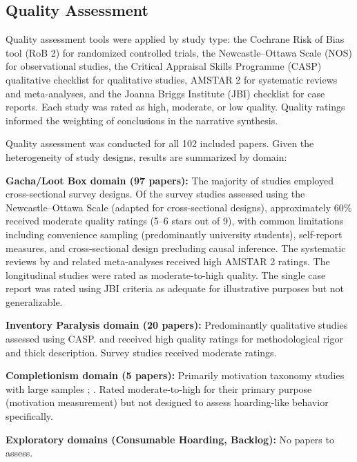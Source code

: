 \documentclass[12pt]{article}
\begin{document}
\subsection{Quality Assessment}

Quality assessment tools were applied by study type: the Cochrane Risk of Bias tool (RoB 2) for randomized controlled trials, the Newcastle--Ottawa Scale (NOS) for observational studies, the Critical Appraisal Skills Programme (CASP) qualitative checklist for qualitative studies, AMSTAR 2 for systematic reviews and meta-analyses, and the Joanna Briggs Institute (JBI) checklist for case reports. Each study was rated as high, moderate, or low quality. Quality ratings informed the weighting of conclusions in the narrative synthesis.

Quality assessment was conducted for all 102 included papers. Given the heterogeneity of study designs, results are summarized by domain:

\textbf{Gacha/Loot Box domain (97 papers):} The majority of studies employed cross-sectional survey designs. Of the survey studies assessed using the Newcastle--Ottawa Scale (adapted for cross-sectional designs), approximately 60\% received moderate quality ratings (5--6 stars out of 9), with common limitations including convenience sampling (predominantly university students), self-report measures, and cross-sectional design precluding causal inference. The systematic reviews by \citet{Spicer2022} and related meta-analyses received high AMSTAR 2 ratings. The longitudinal studies \citep{Shibuya2019, Zendle2023b} were rated as moderate-to-high quality. The single case report \citep{Inaguma2024} was rated using JBI criteria as adequate for illustrative purposes but not generalizable.

\textbf{Inventory Paralysis domain (20 papers):} Predominantly qualitative studies assessed using CASP. \citet{Watkins2012} and \citet{Koles2025} received high quality ratings for methodological rigor and thick description. Survey studies \citep{Koklic2025} received moderate ratings.

\textbf{Completionism domain (5 papers):} Primarily motivation taxonomy studies with large samples \citep[n=30,000]{Yee2006}; \citep[n=3,818]{Demetrovics2011}. Rated moderate-to-high for their primary purpose (motivation measurement) but not designed to assess hoarding-like behavior specifically.

\textbf{Exploratory domains (Consumable Hoarding, Backlog):} No papers to assess.
\end{document}
